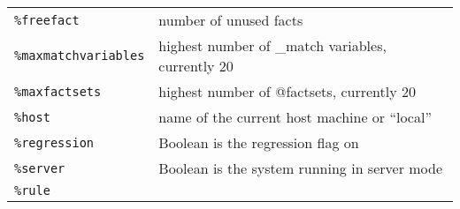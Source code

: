 \documentclass[]{article}
\begin{document}
\begin{longtable}[]{@{}ll@{}}
\begin{minipage}[t]{0.12\columnwidth}\raggedright\strut
\texttt{\%freefact}\strut
\end{minipage} & \begin{minipage}[t]{0.10\columnwidth}\raggedright\strut
number of unused facts\strut
\end{minipage}\tabularnewline
\begin{minipage}[t]{0.12\columnwidth}\raggedright\strut
\texttt{\%maxmatchvariables}\strut
\end{minipage} & \begin{minipage}[t]{0.10\columnwidth}\raggedright\strut
highest number of \_match variables, currently 20\strut
\end{minipage}\tabularnewline
\begin{minipage}[t]{0.12\columnwidth}\raggedright\strut
\texttt{\%maxfactsets}\strut
\end{minipage} & \begin{minipage}[t]{0.10\columnwidth}\raggedright\strut
highest number of @factsets, currently 20\strut
\end{minipage}\tabularnewline
\begin{minipage}[t]{0.12\columnwidth}\raggedright\strut
\texttt{\%host}\strut
\end{minipage} & \begin{minipage}[t]{0.10\columnwidth}\raggedright\strut
name of the current host machine or ``local''\strut
\end{minipage}\tabularnewline
\begin{minipage}[t]{0.12\columnwidth}\raggedright\strut
\texttt{\%regression}\strut
\end{minipage} & \begin{minipage}[t]{0.10\columnwidth}\raggedright\strut
Boolean is the regression flag on\strut
\end{minipage}\tabularnewline
\begin{minipage}[t]{0.12\columnwidth}\raggedright\strut
\texttt{\%server}\strut
\end{minipage} & \begin{minipage}[t]{0.10\columnwidth}\raggedright\strut
Boolean is the system running in server mode\strut
\end{minipage}\tabularnewline
\begin{minipage}[t]{0.12\columnwidth}\raggedright\strut
\texttt{\%rule}\strut
\end{minipage} & \begin{minipage}[t]{0.10\columnwidth}\raggedright\strut

\end{minipage}
\end{longtable}
\end{document}
